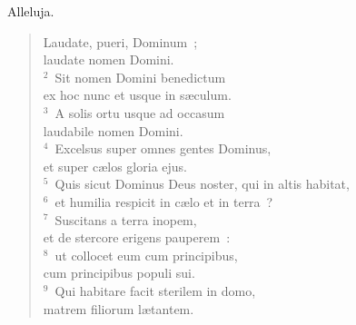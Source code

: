 \lettrine[lines=3,image=true,loversize=0.05,lraise=-0.03]{A}{}lleluja. \begin{flushleft}\begin{verse}\vspace{6pt}Laudate, pueri, Dominum~;\\ laudate nomen Domini.\\
${}^{2}$~Sit nomen Domini benedictum\\ ex hoc nunc et usque in s\ae culum.\\
${}^{3}$~A solis ortu usque ad occasum\\ laudabile nomen Domini.\\
${}^{4}$~Excelsus super omnes gentes Dominus,\\ et super c\ae los gloria ejus.\\
${}^{5}$~Quis sicut Dominus Deus noster, qui in altis habitat,\\
${}^{6}$~et humilia respicit in c\ae lo et in terra~?\\
${}^{7}$~Suscitans a terra inopem,\\ et de stercore erigens pauperem~:\\
${}^{8}$~ut collocet eum cum principibus,\\ cum principibus populi sui.\\
${}^{9}$~Qui habitare facit sterilem in domo,\\ matrem filiorum l\ae tantem.\end{verse}\end{flushleft}




